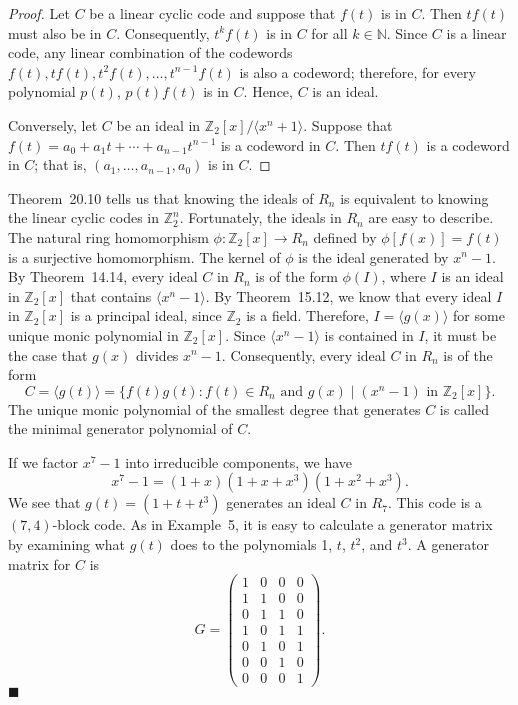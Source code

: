 \begin{proof}
Let $C$ be a linear cyclic code and suppose that $f(t)$ is in $C$.  Then $t f(t)$ must also be in $C$. Consequently, $t^k f(t)$ is in $C$ for all $k \in {\mathbb N}$.  Since $C$ is a linear code, any linear combination of the codewords $f(t), tf(t), t^2f(t), \ldots, t^{n-1}f(t)$ is also a codeword; therefore, for every polynomial $p(t)$, $p(t)f(t)$ is in $C$.  Hence, $C$ is an ideal. 

Conversely, let $C$ be an ideal in ${\mathbb Z}_2[x]/\langle x^n + 1\rangle$. Suppose that $f(t) = a_0 + a_1 t + \cdots + a_{n - 1} t^{n - 1}$ is a codeword in $C$.  Then $t f(t)$ is a codeword in $C$; that is, $(a_1, \ldots, a_{n-1}, a_0)$ is in $C$.
\end{proof} 

\medskip

Theorem~20.10 tells us that knowing the ideals of $R_n$ is equivalent to knowing the linear cyclic codes in ${\mathbb Z}_2^n$.  Fortunately, the ideals in $R_n$ are easy to describe.  The  natural ring homomorphism $\phi : {\mathbb Z}_2[x] \rightarrow R_n$ defined by $\phi[f(x)] = f(t)$ is a surjective homomorphism.  The kernel of $\phi$ is the ideal generated by $x^n - 1$.  By Theorem~14.14, every ideal $C$ in $R_n$ is of the form $\phi(I)$, where $I$ is an ideal in ${\mathbb Z}_2[x]$ that contains $\langle x^n - 1 \rangle$.  By Theorem~15.12, we know that every ideal $I$ in ${\mathbb Z}_2[x]$ is a principal ideal, since ${\mathbb Z}_2$ is a field. Therefore, $I = \langle g(x) \rangle$ for some unique monic polynomial in ${\mathbb Z}_2[x]$. Since $\langle x^n - 1 \rangle$ is contained in $I$, it must be the case that $g(x)$ divides $x^n - 1$. Consequently, every ideal $C$ in $R_n$ is of the form 
$$
C= \langle g(t) \rangle = \{ f(t)g(t) : f(t) \in R_n \mbox{ and $g(x)
\mid (x^n - 1)$ in } {\mathbb Z}_2[x] \}.
$$ 
The unique monic polynomial of the smallest degree that generates $C$ is called the {\bfi minimal generator polynomial\/} of $C$. 

\medskip

If we factor $x^7 - 1$ into irreducible components, we have
$$
x^7 - 1 = (1 + x)(1 + x + x^3)(1+ x^2 + x^3).
$$
We see that $g(t) = (1 + t + t^3)$ generates an ideal $C$ in $R_7$.  This code is a $(7, 4)$-block code.  As in Example~5, it is easy to calculate a generator matrix by examining what $g(t)$ does to the polynomials 1, $t$, $t^2$, and $t^3$.  A generator matrix for $C$ is 
$$
G =
\left(
\begin{array}{cccc}
1 & 0 & 0 & 0 \\
1 & 1 & 0 & 0 \\
0 & 1 & 1 & 0 \\
1 & 0 & 1 & 1 \\
0 & 1 & 0 & 1 \\
0 & 0 & 1 & 0 \\
0 & 0 & 0 & 1
\end{array}
\right).
$$
\hspace{\fill} $\blacksquare$

